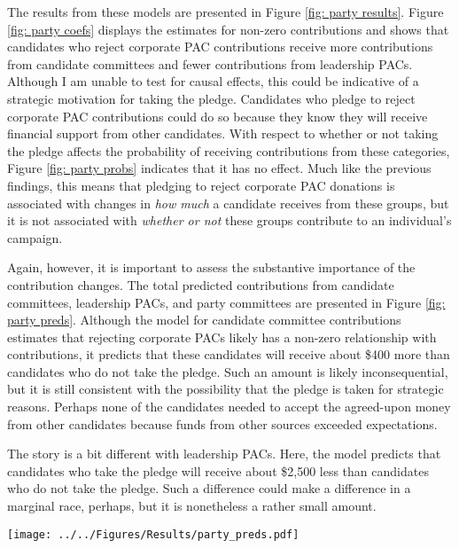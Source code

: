 \documentclass[12pt]{article}
\begin{document}
The results from these models are presented in Figure \ref{fig: party results}. Figure \ref{fig: party coefs} displays the estimates for non-zero contributions and shows that candidates who reject corporate PAC contributions receive more contributions from candidate committees and fewer contributions from leadership PACs. Although I am unable to test for causal effects, this could be indicative of a strategic motivation for taking the pledge. Candidates who pledge to reject corporate PAC contributions could do so because they know they will receive financial support from other candidates. With respect to whether or not taking the pledge affects the probability of receiving contributions from these categories, Figure \ref{fig: party probs} indicates that it has no effect. Much like the previous findings, this means that pledging to reject corporate PAC donations is associated with changes in \emph{how much} a candidate receives from these groups, but it is not associated with \emph{whether or not} these groups contribute to an individual's campaign. 

Again, however, it is important to assess the substantive importance of the contribution changes. The total predicted contributions from candidate committees, leadership PACs, and party committees are presented in Figure \ref{fig: party preds}. Although the model for candidate committee contributions estimates that rejecting corporate PACs likely has a non-zero relationship with contributions, it predicts that these candidates will receive about \$400 more than candidates who do not take the pledge. Such an amount is likely inconsequential, but it is still consistent with the possibility that the pledge is taken for strategic reasons. Perhaps none of the candidates needed to accept the agreed-upon money from other candidates because funds from other sources exceeded expectations. 

The story is a bit different with leadership PACs. Here, the model predicts that candidates who take the pledge will receive about \$2,500 less than candidates who do not take the pledge. Such a difference could make a difference in a marginal race, perhaps, but it is nonetheless a rather small amount.    

\begin{figure*}[!htb]
    \centering
    \texttt{[image: ../../Figures/Results/party\_preds.pdf]}
    \caption{\textbf{Total Predicted Contributions from Each Party Organization by Candidate Type.} This figure shows that candidates who pledge to reject PAC contributions are predicted to received fewer contributions from leadership PACs but more contributions from candidate and party committees.}
    \label{fig: party preds}
\end{figure*}
\end{document}

